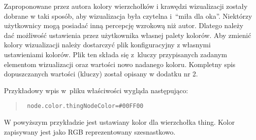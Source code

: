 Zaproponowane przez autora kolory wierzchołków i krawędzi wizualizacji zostały dobrane w taki sposób, aby wizualizacja była czytelna i~``miła dla oka''.
Niektórzy użytkownicy mogą posiadać inną percepcję wzrokową niż autor. Dlatego należy dać możliwość ustawienia przez użytkownika własnej palety
 kolorów. Aby zmienić kolory wizualizacji należy dostarczyć plik konfiguracyjny z własnymi ustawieniami kolorów. Plik ten składa się z~kluczy przypisanych 
zadanym elementom wizualizacji oraz wartości nowo nadanego koloru. Kompletny spis dopuszczanych wartości (kluczy) został opisany w dodatku nr 2. 
\par Przykładowy wpis w~pliku właściwości wygląda następująco:
\begin{quote}
  \verb+ node.color.thingNodeColor=#00FF00+
\end{quote}
W powyższym przykładzie jest ustawiany kolor dla wierzchołka thing. Kolor zapisywany jest jako RGB reprezentowany szesnastkowo. 
  
